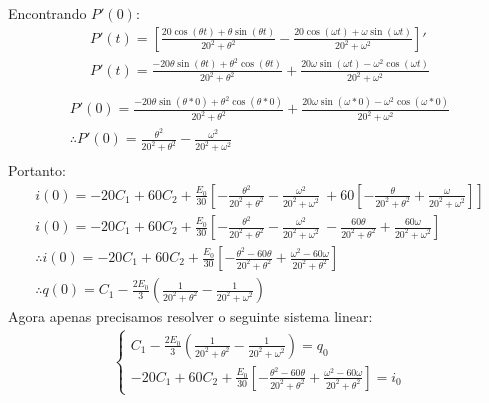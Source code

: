 \documentclass{abntex2}
\begin{document}
\Large Encontrando $P'(0)$:\\
\begin{eqnarray*}
    P'(t) = \left[\frac{ 20\cos{(\theta t)} +\theta\sin{(\theta t)}}{20^2 +\theta^2} - \frac{20\cos{(\omega t)} +\omega\sin{(\omega t)}}{20^2 +\omega^2}\right]'\\
    P'(t) = \frac{ -20\theta\sin{(\theta t)} +\theta^2\cos{(\theta t)}}{20^2 +\theta^2} + \frac{20\omega\sin{(\omega t)} -\omega^2\cos{(\omega t)}}{20^2 +\omega^2}\\
\end{eqnarray*}
\begin{eqnarray*}
    P'(0) = \frac{ -20\theta\sin{(\theta *0)} +\theta^2\cos{(\theta *0)}}{20^2 +\theta^2} + \frac{20\omega\sin{(\omega *0)} -\omega^2\cos{(\omega *0)}}{20^2 +\omega^2}\\
    \therefore P'(0) = \frac{\theta^2}{20^2 +\theta^2} - \frac{\omega^2}{20^2 +\omega^2}\\
\end{eqnarray*}
\Large Portanto:\\
\begin{eqnarray*}
    i(0) = -20C_1 + 60C_2 + \frac{E_0}{30}\left[-\frac{\theta^2}{20^2 +\theta^2} - \frac{\omega^2}{20^2 +\omega^2}\ + 60\left[-\frac{\theta}{20^2 +\theta^2} + \frac{\omega}{20^2 +\omega^2}\right]\right]\\
    i(0) = -20C_1 + 60C_2 + \frac{E_0}{30}\left[-\frac{\theta^2}{20^2 +\theta^2} - \frac{\omega^2}{20^2 +\omega^2}\ -\frac{60\theta}{20^2 +\theta^2} + \frac{60\omega}{20^2 +\omega^2}\right]\\
    \therefore i(0) = -20C_1 + 60C_2 + \frac{E_0}{30}\left[-\frac{\theta^2 - {60\theta}}{20^2 +\theta^2} +\frac{\omega^2 - 60\omega}{20^2 +\theta^2}\right]\\
    \therefore q(0) = C_1 - \frac{2E_0}{3}\left(\frac{1}{20^2 +\theta^2} - \frac{1}{20^2 +\omega^2}\right)
\end{eqnarray*}
\Large Agora apenas precisamos resolver o seguinte sistema linear:\\
\begin{eqnarray*}
    \left\{\begin{matrix}
        C_1 - \frac{2E_0}{3}\left(\frac{1}{20^2 +\theta^2} - \frac{1}{20^2 +\omega^2}\right) = q_0\\
        -20C_1 + 60C_2 + \frac{E_0}{30}\left[-\frac{\theta^2 - {60\theta}}{20^2 +\theta^2} +\frac{\omega^2 - 60\omega}{20^2 +\theta^2}\right] = i_0
    \end{matrix}\right.
\end{eqnarray*}
\end{document}
